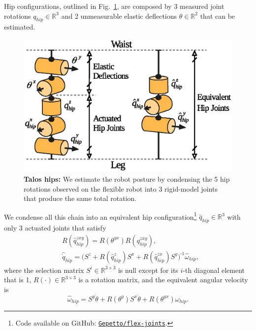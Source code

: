 \documentclass[letterpaper, 10 pt, conference]{ieeeconf}  %
\begin{document}
Hip configurations, outlined in Fig.~\ref{Fig.HipJoints}, are composed by 3 measured joint rotations $ q_\mathit{hip}^{ } \in \mathbb{R}^3 $ and 2 unmeasurable elastic deflections $\theta \in \mathbb{R}^2 $ that can be estimated.
%
\begin{figure}
	\centering
	\includegraphics[trim={0 1mm 0 0},clip,width=.44\textwidth]{Hip_joints.eps}
	\caption{\textbf{Talos hips:} We estimate the robot posture by condensing the 5 hip rotations observed on the flexible robot into 3 rigid-model joints that produce the same total rotation.} \label{Fig.HipJoints}
\end{figure} 
%
We condense all this chain into an equivalent hip configuration\footnote{Code available on GitHub: \href{ https://github.com/Gepetto/flex-joints}{\texttt{Gepetto/flex-joints}}.} $\hat{q}_\mathit{hip}^{ } \in \mathbb{R}^3 $ with only $3$ actuated joints that satisfy
%
\begin{align}
    &R(\hat{q}_\mathit{hip}^{zxy}) = R(\theta^{yx})R(q_\mathit{hip}^{zxy}),\\
    &\hat{\dot{q}}_\mathit{hip} = \Big(S^{z}+R(\hat{q}_\mathit{hip}^{z})S^{x}+R(\hat{q}_\mathit{hip}^{zx})S^{y} \Big)^{\!\texttt{-}1}\hat{\omega}_\mathit{hip},
\end{align}
%
where the selection matrix $S^i \in \mathbb{R}^{3\times 3}$ is null except for its $i$-th diagonal element that is 1, $ R(\cdot) \in \mathbb{R}^{3\times 3}$ is a rotation matrix, and the equivalent angular velocity is 
\begin{equation}
    \hat{\omega}_\mathit{hip} = S^{y}\dot{\theta} + R(\theta^{y})S^x\dot{\theta} + R(\theta^{yx})\omega_\mathit{hip}.
\end{equation}
\end{document}
